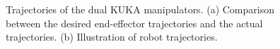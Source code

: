 \documentclass[journal,twoside,web]{ieeecolor}
\begin{document}
\begin{figure}[!t]
    \centering
    \caption{Trajectories of the dual KUKA manipulators. (a) Comparison between the desired end-effector trajectories and the actual trajectories. (b) Illustration of robot trajectories.
    }
    \label{figures:simulation:path comparison}
\end{figure}
\end{document}
